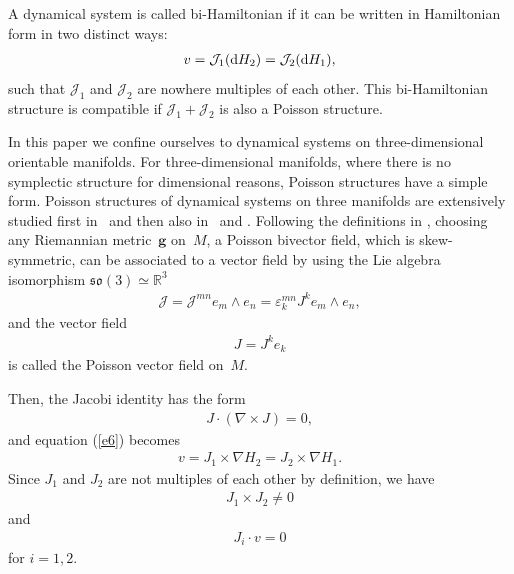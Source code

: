 \documentclass[10pt,a4paper]{amsart}
\numberwithin{equation}{section}
\begin{document}
\begin{Definition}\label{definition1}
A dynamical system is called bi-Hamiltonian if it can be written in Hamiltonian form in two distinct ways:
\begin{gather}
v=\mathcal{J}_{1}( {\rm d}H_{2}) =\mathcal{J}_{2}( {\rm d}H_{1}),\label{e6}
\end{gather}
such that $\mathcal{J}_{1}$ and $\mathcal{J}_{2}$ are nowhere multiples of each other. This bi-Hamiltonian structure is compatible if $\mathcal{J}_{1}+\mathcal{J}_{2}$ is also a Poisson structure.
\end{Definition}

In this paper we conf\/ine ourselves to dynamical systems on three-dimensional orientable manifolds. For three-dimensional manifolds, where there is no symplectic structure for dimensional reasons, Poisson structures have a simple form. Poisson structures of dynamical systems on three manifolds are extensively studied f\/irst in~\cite{Nutku} and then also in~\cite{Haas} and \cite{Gengoux}. Following the def\/initions in \cite{Nutku}, choosing any Riemannian metric~$\boldsymbol{g}$ on~$M$, a Poisson bivector f\/ield, which is skew-symmetric, can be associated to a vector f\/ield by using the Lie algebra isomorphism $\mathfrak{so}(3) \simeq \mathbb{R}^{3}$
\begin{gather*}
\mathcal{J}=\mathcal{J}^{mn}e_{m}\wedge e_{n}=\varepsilon _{k}^{mn}J^{k}e_{m}\wedge e_{n},
\end{gather*}
and the vector f\/ield
\begin{gather*}
J=J^{k}e_{k}
\end{gather*}
is called the Poisson vector f\/ield on~$M$.

Then, the Jacobi identity has the form
\begin{gather}
J\cdot ( \nabla \times J) =0, \label{e9}
\end{gather}
and equation (\ref{e6}) becomes
\begin{gather}
v=J_{1}\times \nabla H_{2}=J_{2}\times \nabla H_{1}. \label{e10}
\end{gather}
Since $J_{1}$ and $J_{2}$ are not multiples of each other by def\/inition, we have
\begin{gather}
J_{1}\times J_{2}\neq 0 \label{e11}
\end{gather}
and
\begin{gather}
J_{i}\cdot v=0 \label{e12}
\end{gather}
for $i=1,2$.
\end{document}
